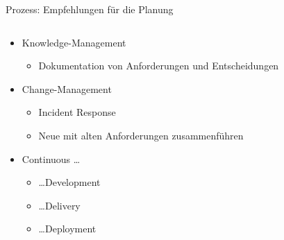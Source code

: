\begin{frame}{Prozess: Empfehlungen für die Planung}
\begin{columns}[fullwidth]
\begin{column}{\linewidth}
  \begin{itemize}
    
    \item Knowledge-Management
    \begin{itemize}
      \item Dokumentation von Anforderungen und Entscheidungen
    \end{itemize}

    \item Change-Management %
    \begin{itemize}
      \item Incident Response
      \item Neue mit alten Anforderungen zusammenführen
    \end{itemize}
    
    \item Continuous \ldots
    \begin{itemize}
      \item \dots Development
      \item \dots Delivery
      \item \dots Deployment
    \end{itemize}

  \end{itemize}
  \end{column}
  \end{columns}
\end{frame}


